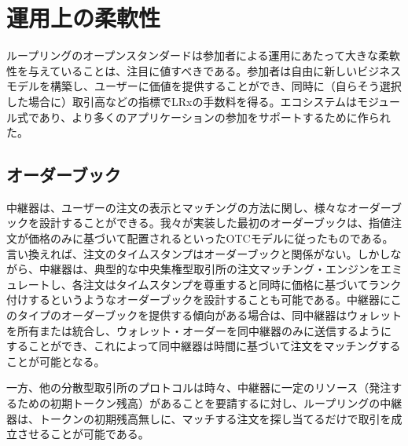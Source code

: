 \documentclass{article}
\makeatletter
\newenvironment{figurehere}
 {\def\@captype{figure}}
 {}
\makeatother
\begin{document}
\begin{multicols}{2}
\begin{enumerate}
\end{enumerate}





%
%
%


\section{運用上の柔軟性\label{sec:business_model}}
ループリングのオープンスタンダードは参加者による運用にあたって大きな柔軟性を与えていることは、注目に値すべきである。参加者は自由に新しいビジネスモデルを構築し、ユーザーに価値を提供することができ、同時に（自らそう選択した場合に）取引高などの指標でLRxの手数料を得る。エコシステムはモジュール式であり、より多くのアプリケーションの参加をサポートするために作られた。

\subsection{オーダーブック\label{sec:order_book}}
中継器は、ユーザーの注文の表示とマッチングの方法に関し、様々なオーダーブックを設計することができる。我々が実装した最初のオーダーブックは、指値注文が価格のみに基づいて配置されるといったOTCモデルに従ったものである。言い換えれば、注文のタイムスタンプはオーダーブックと関係がない。しかしながら、中継器は、典型的な中央集権型取引所の注文マッチング・エンジンをエミュレートし、各注文はタイムスタンプを尊重すると同時に価格に基づいてランク付けするというようなオーダーブックを設計することも可能である。中継器にこのタイプのオーダーブックを提供する傾向がある場合は、同中継器はウォレットを所有または統合し、ウォレット・オーダーを同中継器のみに送信するようにすることができ、これによって同中継器は時間に基づいて注文をマッチングすることが可能となる。

一方、他の分散型取引所のプロトコルは時々、中継器に一定のリソース（発注するための初期トークン残高）があることを要請するに対し、ループリングの中継器は、トークンの初期残高無しに、マッチする注文を探し当てるだけで取引を成立させることが可能である。


\end{multicols}
\end{document}
